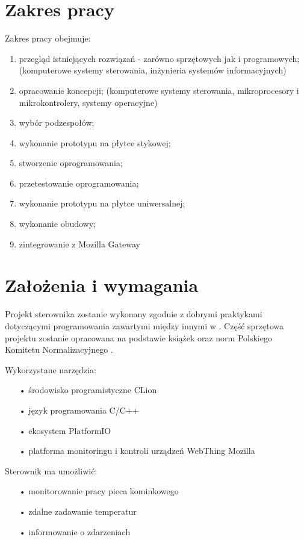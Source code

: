 \documentclass[11pt]{report}
\begin{document}
 \section{Zakres pracy}
 Zakres pracy obejmuje:
 \begin{enumerate}
 \item przegląd istniejących rozwiązań - zarówno sprzętowych jak i programowych; (komputerowe systemy sterowania, inżynieria systemów informacyjnych)
 \item opracowanie koncepcji; (komputerowe systemy sterowania, mikroprocesory i mikrokontrolery, systemy operacyjne)
 \item wybór podzespołów;
 \item wykonanie prototypu na płytce stykowej;
 \item stworzenie oprogramowania;
 \item przetestowanie oprogramowania; 
 \item wykonanie prototypu na płytce uniwersalnej;
 \item wykonanie obudowy;
 \item zintegrowanie z Mozilla Gateway
 \end{enumerate}
 
 \section{Założenia i wymagania}
 Projekt sterownika zostanie wykonany zgodnie z dobrymi praktykami dotyczącymi programowania zawartymi między innymi w \cite{Grebosz2018} \cite{Francuz2015}. Część sprzętowa projektu zostanie opracowana na podstawie książek \cite{Monk2014} \cite{Monk2014a} \cite{Monk2018} \cite{Kurczyk2019} \cite{Huang2018} \cite{Wallace2019} oraz norm Polskiego Komitetu Normalizacyjnego \cite{PKN1999} \cite{PKN2000}.
 
 Wykorzystane narzędzia:
 \begin{enumerate}
 \item[•] środowisko programistyczne CLion
 \item[•] język programowania C/C++
 \item[•] ekosystem PlatformIO
 \item[•] platforma monitoringu i kontroli urządzeń WebThing Mozilla
 \end{enumerate}
 
 Sterownik ma umożliwić:
 \begin{enumerate}
 \item[•] monitorowanie pracy pieca kominkowego
 \item[•] zdalne zadawanie temperatur
 \item[•] informowanie o zdarzeniach
 \end{enumerate}
 
\end{document}
